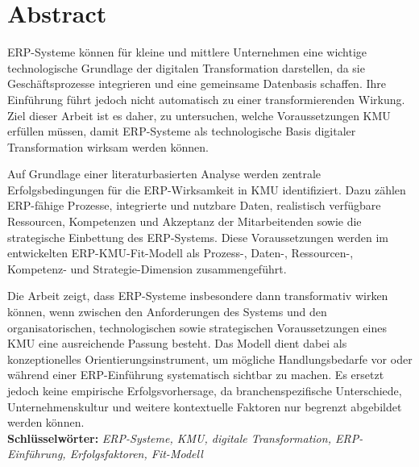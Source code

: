 \chapter*{Abstract}

ERP-Systeme können für kleine und mittlere Unternehmen eine wichtige technologische Grundlage der digitalen 
Transformation darstellen, da sie Geschäftsprozesse integrieren und eine gemeinsame Datenbasis schaffen. Ihre 
Einführung führt jedoch nicht automatisch zu einer transformierenden Wirkung. Ziel dieser Arbeit ist es daher, 
zu untersuchen, welche Voraussetzungen KMU erfüllen müssen, damit ERP-Systeme als technologische Basis digitaler 
Transformation wirksam werden können.

Auf Grundlage einer literaturbasierten Analyse werden zentrale Erfolgsbedingungen für die ERP-Wirksamkeit in KMU 
identifiziert. Dazu zählen ERP-fähige Prozesse, integrierte und nutzbare Daten, realistisch verfügbare Ressourcen, 
Kompetenzen und Akzeptanz der Mitarbeitenden sowie die strategische Einbettung des ERP-Systems. Diese Voraussetzungen 
werden im entwickelten ERP-KMU-Fit-Modell als Prozess-, Daten-, Ressourcen-, Kompetenz- und Strategie-Dimension zusammengeführt.

Die Arbeit zeigt, dass ERP-Systeme insbesondere dann transformativ wirken können, wenn zwischen den Anforderungen des 
Systems und den organisatorischen, technologischen sowie strategischen Voraussetzungen eines KMU eine ausreichende Passung 
besteht. Das Modell dient dabei als konzeptionelles Orientierungsinstrument, um mögliche Handlungsbedarfe vor oder während 
einer ERP-Einführung systematisch sichtbar zu machen. Es ersetzt jedoch keine empirische Erfolgsvorhersage, da 
branchenspezifische Unterschiede, Unternehmenskultur und weitere kontextuelle Faktoren nur begrenzt abgebildet werden können.\\  

\medskip
\noindent\textbf{Schlüsselwörter:} \emph{ERP-Systeme, KMU, digitale Transformation, ERP-Einführung, Erfolgsfaktoren, Fit-Modell}

